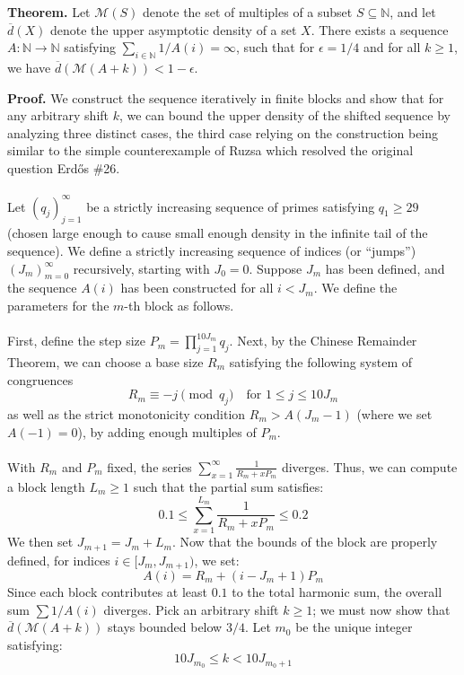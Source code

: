 \noindent \textbf{Theorem.} Let $\mathcal{M}(S)$ denote the set of multiples of a subset $S \subseteq \mathbb{N}$, and let $\overline{d}(X)$ denote the upper asymptotic density of a set $X$. There exists a sequence $A : \mathbb{N} \to \mathbb{N}$ satisfying $\sum_{i \in \mathbb{N}} 1/A(i) = \infty$, such that for $\epsilon = 1/4$ and for all $k \ge 1$, we have $\overline{d}(\mathcal{M}(A + k)) < 1 - \epsilon$. 

\noindent \textbf{Proof.} We construct the sequence iteratively in finite blocks and show that for any arbitrary shift $k$, we can bound the upper density of the shifted sequence by analyzing three distinct cases, the third case relying on the construction being similar to the simple counterexample of Ruzsa which resolved the original question Erd\H{o}s \#26.
\\\\
Let $(q_j)_{j=1}^\infty$ be a strictly increasing sequence of primes satisfying $q_1 \ge 29$ (chosen large enough to cause small enough density in the infinite tail of the sequence). We define a strictly increasing sequence of indices (or ``jumps'') $(J_m)_{m=0}^\infty$ recursively, starting with $J_0 = 0$. Suppose $J_m$ has been defined, and the sequence $A(i)$ has been constructed for all $i < J_m$. We define the parameters for the $m$-th block as follows.
\\\\
First, define the step size $P_m = \prod_{j = 1}^{10J_m} q_j$. Next, by the Chinese Remainder Theorem, we can choose a base size $R_m$ satisfying the following system of congruences
$$R_m \equiv -j \pmod{q_j} \quad \text{for } 1 \leq j \leq 10J_m$$
as well as the strict monotonicity condition $R_m > A(J_m - 1)$ (where we set $A(-1) = 0$), by adding enough multiples of $P_m$.
\\\\
With $R_m$ and $P_m$ fixed, the series $\sum_{x=1}^\infty \frac{1}{R_m + xP_m}$ diverges. Thus, we can compute a block length $L_m \ge 1$ such that the partial sum satisfies:
$$0.1 \leq \sum_{x = 1}^{L_m} \frac{1}{R_m + xP_m} \leq 0.2$$
We then set $J_{m + 1} = J_m + L_m$. Now that the bounds of the block are properly defined, for indices $i \in [J_m, J_{m+1})$, we set:
$$A(i) = R_m + (i - J_m + 1)P_m$$
Since each block contributes at least $0.1$ to the total harmonic sum, the overall sum $\sum 1/A(i)$ diverges. Pick an arbitrary shift $k \ge 1$; we must now show that $\overline{d}(\mathcal{M}(A+k))$ stays bounded below $3/4$. Let $m_0$ be the unique integer satisfying:
$$10J_{m_0} \leq k < 10J_{m_0 + 1}$$
